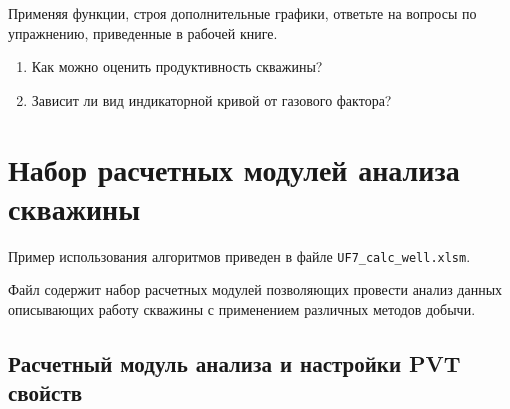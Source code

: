 Применяя функции, строя дополнительные графики, ответьте на вопросы по упражнению, приведенные в рабочей книге.

	\begin{enumerate}
		\item Как можно оценить продуктивность скважины?
		\item Зависит ли вид индикаторной кривой от газового фактора?
	\end{enumerate}

\section{Набор расчетных модулей анализа скважины}
Пример использования алгоритмов \unf   приведен в файле \texttt{UF7\_calc\_well.xlsm}.

Файл содержит набор расчетных модулей позволяющих провести анализ данных описывающих работу скважины с применением различных методов добычи.


\subsection{Расчетный модуль анализа и настройки PVT свойств}

